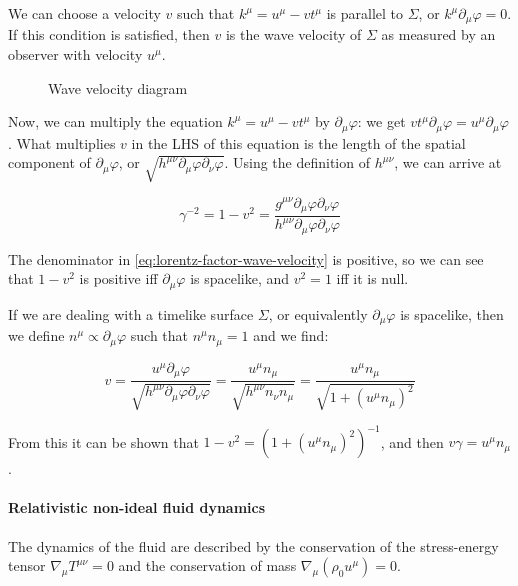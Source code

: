 \documentclass[main.tex]{subfiles}
\begin{document}
We can choose a velocity \(v\) such that \(k^\mu = u^\mu - v t^\mu\) is parallel to \(\Sigma\), or \(k^\mu \partial_\mu \varphi = 0\). If this condition is satisfied, then \(v\) is the wave velocity of \(\Sigma\) as measured by an observer with velocity \(u^\mu\).

\begin{figure}[ht]
  \centering
  \caption{Wave velocity diagram}
  \label{fig:taub_wave_velocity}
\end{figure}

Now, we can multiply the equation \(k^\mu = u^\mu - v t^\mu\) by \(\partial_\mu \varphi\): we get \(v t^\mu \partial_\mu \varphi = u^\mu \partial_\mu \varphi\). What multiplies \(v\) in the LHS of this equation is the length of the spatial component of \(\partial_\mu \varphi\), or \(\sqrt{h^{\mu\nu} \partial_\mu \varphi \partial_\nu \varphi}\).
Using the definition of \(h ^{\mu \nu} \), we can arrive at

\begin{equation} \label{eq:lorentz-factor-wave-velocity}
    \gamma^{-2} = 1 - v^2 = \frac{g^{\mu\nu} \partial_\mu \varphi \partial_\nu \varphi}{h^{\mu\nu} \partial_\mu \varphi \partial_\nu \varphi}
\end{equation}

The denominator in \eqref{eq:lorentz-factor-wave-velocity} is positive, so we can see that \(1-v^2\) is positive iff \(\partial_\mu \varphi\) is spacelike, and \(v^2 = 1\) iff it is null.

If we are dealing with a timelike surface \(\Sigma\), or equivalently \(\partial_\mu \varphi\) is spacelike, then we define \(n^\mu \propto \partial_\mu \varphi\) such that \(n^\mu n_\mu = 1\) and we find:

\begin{equation}
    v = \frac{u^\mu \partial_\mu \varphi}{\sqrt{h^{\mu\nu} \partial_\mu \varphi \partial_\nu \varphi}}
    = \frac{u^\mu n_\mu}{\sqrt{h^{\mu\nu} n_\nu n_\mu}}
    = \frac{u^\mu n_\mu}{\sqrt{1 + (u^\mu n_\mu)^2}}
\end{equation}

From this it can be shown that \(1-v^2 = (1+(u^\mu n_\mu)^2)^{-1}\), and then \(v \gamma = u^\mu n_\mu\).

\paragraph{Relativistic non-ideal fluid dynamics}

The dynamics of the fluid are described by the conservation of the stress-energy tensor \(\nabla_\mu T ^{\mu \nu} =0\) and the conservation of mass \(\nabla_\mu (\rho_0 u^\mu) =0\).
\end{document}
